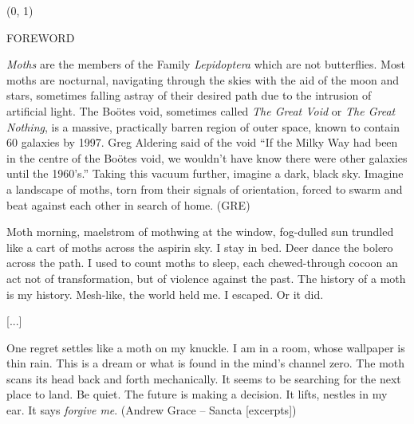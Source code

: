 \documentclass[11pt]{article}
\begin{document}
\begin{textblock}{23}(0, 1)
\begin{center}
\huge FOREWORD
\end{center}
\end{textblock}

\vspace*{0.25\baselineskip}

\begingroup
\begin{center}
\textit{Moths} are the members of the Family \textit{Lepidoptera} which are not butterflies. Most moths are nocturnal, navigating through the skies with the aid of the moon and stars, sometimes falling astray of their desired path due to the intrusion of artificial light. The Bo\"otes void, sometimes called \textit{The Great Void} or \textit{The Great Nothing}, is a massive, practically barren region of outer space, known to contain 60 galaxies by 1997. Greg Aldering said of the void ``If the Milky Way had been in the centre of the Bo\"otes void, we wouldn't have know there were other galaxies until the 1960's.'' Taking this vacuum further, imagine a dark, black sky. Imagine a landscape of moths, torn from their signals of orientation, forced to swarm and beat against each other in search of home.
\rightskip\leftskip
\phantom{text} \hfill (GRE)

\vspace*{2\baselineskip}

Moth morning, maelstrom of mothwing at the window, fog-dulled sun trundled like a cart of moths across the aspirin sky. I stay in bed. Deer dance the bolero across the path. I used to count moths to sleep, each chewed-through cocoon an act not of transformation, but of violence against the past. The history of a moth is my history. Mesh-like, the world held me. I escaped. Or it did.
\rightskip\leftskip
\phantom{text}

[...]

One regret settles like a moth on my knuckle. I am in a room, whose wallpaper is thin rain. This is a dream or what is found in the mind's channel zero. The moth scans its head back and forth mechanically. It seems to be searching for the next place to land. Be quiet. The future is making a decision. It lifts, nestles in my ear. It says \textit{forgive me}.
\rightskip\leftskip
\phantom{text} \hfill (Andrew Grace -- Sancta [excerpts])
\end{center}
\endgroup

\end{document}
